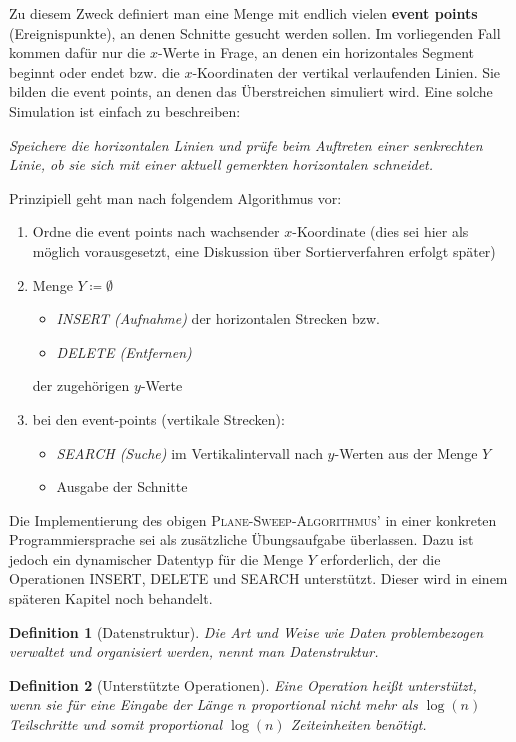 \documentclass[ngerman,draft,parskip=half*,twoside]{scrreprt}
\theoremstyle{break}
\newtheorem{definition}{Definition}[chapter]
\theoremstyle{nonumberbreak}
\begin{document}
Zu diesem Zweck definiert man eine Menge mit endlich vielen \textbf{event
points} (Ereignispunkte), an denen Schnitte gesucht werden sollen. Im
vorliegenden Fall kommen dafür nur die $x$-Werte in Frage, an denen ein
horizontales Segment beginnt oder endet bzw. die $x$-Koordinaten der
vertikal verlaufenden Linien. Sie bilden die event points, an denen das
Überstreichen simuliert wird. Eine solche Simulation ist einfach zu
beschreiben:

\textit{Speichere die horizontalen Linien und prüfe beim Auftreten einer
senkrechten Linie, ob sie sich mit einer aktuell gemerkten horizontalen
schneidet.}

Prinzipiell geht man nach folgendem Algorithmus vor:
\begin{enumerate}
 \item Ordne die event points nach wachsender $x$-Koordinate (dies sei hier
  als möglich vorausgesetzt, eine Diskussion über Sortierverfahren erfolgt
  später)
 \item Menge $Y \coloneqq \emptyset$  
  \begin{itemize}
   \item \textit{INSERT (Aufnahme)} der horizontalen Strecken bzw.
   \item \textit{DELETE (Entfernen)}
  \end{itemize}
  der zugehörigen $y$-Werte
 \item bei den event-points (vertikale Strecken):
  \begin{itemize}
   \item \textit{SEARCH (Suche)} im Vertikalintervall nach $y$-Werten aus der 
    Menge $Y$
   \item Ausgabe der Schnitte
  \end{itemize}
\end{enumerate}

Die Implementierung des obigen
\textsc{Plane-Sweep-Algorithmus'} in einer konkreten Programmiersprache
sei als zusätzliche Übungsaufgabe überlassen. Dazu ist jedoch ein dynamischer
Datentyp für die Menge $Y$ erforderlich, der die Operationen INSERT,
DELETE und SEARCH unterstützt. Dieser wird in einem späteren Kapitel noch behandelt. 

\begin{definition}[Datenstruktur]
  Die Art und Weise wie Daten problembezogen verwaltet und organisiert
  werden, nennt man Datenstruktur.
\end{definition}

\label{ADT}
\begin{definition}[Unterstützte Operationen]
  Eine Operation heißt unterstützt, wenn sie für eine Eingabe
  der Länge $n$ proportional nicht mehr als $\log(n)$ Teilschritte und
  somit proportional $\log(n)$ Zeiteinheiten benötigt.
\end{definition}
\end{document}
